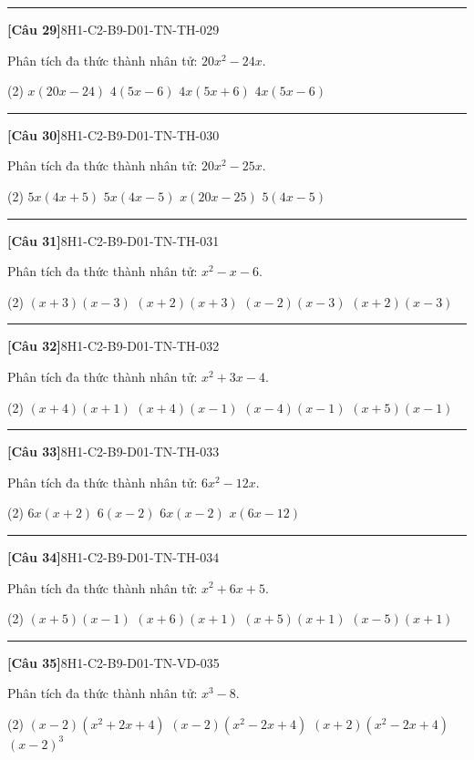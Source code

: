 \documentclass[12pt,a4paper]{article}
\newif\ifloigiai
\newenvironment{cauhoi}[2]{%
  \par\medskip\noindent\rule{\textwidth}{0.4pt}\par\nopagebreak
  \noindent\textbf{[#1]}\hfill{\scriptsize\ttfamily #2}\par\nopagebreak\smallskip}{\par}
\newcommand{\dapan}[1]{\ifloigiai\par\smallskip\noindent\textit{Đáp án:} \textbf{#1}\par\fi}
\begin{document}
\begin{cauhoi}{Câu 29}{8H1-C2-B9-D01-TN-TH-029}
Phân tích đa thức thành nhân tử: $20x^{2} - 24x$.
\begin{tasks}(2)
\task $x(20x - 24)$
\task $4(5x - 6)$
\task $4x(5x + 6)$
\task $4x(5x - 6)$
\end{tasks}
\dapan{D}
\end{cauhoi}
\begin{cauhoi}{Câu 30}{8H1-C2-B9-D01-TN-TH-030}
Phân tích đa thức thành nhân tử: $20x^{2} - 25x$.
\begin{tasks}(2)
\task $5x(4x + 5)$
\task $5x(4x - 5)$
\task $x(20x - 25)$
\task $5(4x - 5)$
\end{tasks}
\dapan{B}
\end{cauhoi}
\begin{cauhoi}{Câu 31}{8H1-C2-B9-D01-TN-TH-031}
Phân tích đa thức thành nhân tử: $x^{2} - x - 6$.
\begin{tasks}(2)
\task $(x + 3)(x - 3)$
\task $(x + 2)(x + 3)$
\task $(x - 2)(x - 3)$
\task $(x + 2)(x - 3)$
\end{tasks}
\dapan{D}
\end{cauhoi}
\begin{cauhoi}{Câu 32}{8H1-C2-B9-D01-TN-TH-032}
Phân tích đa thức thành nhân tử: $x^{2} + 3x - 4$.
\begin{tasks}(2)
\task $(x + 4)(x + 1)$
\task $(x + 4)(x - 1)$
\task $(x - 4)(x - 1)$
\task $(x + 5)(x - 1)$
\end{tasks}
\dapan{B}
\end{cauhoi}
\begin{cauhoi}{Câu 33}{8H1-C2-B9-D01-TN-TH-033}
Phân tích đa thức thành nhân tử: $6x^{2} - 12x$.
\begin{tasks}(2)
\task $6x(x + 2)$
\task $6(x - 2)$
\task $6x(x - 2)$
\task $x(6x - 12)$
\end{tasks}
\dapan{C}
\end{cauhoi}
\begin{cauhoi}{Câu 34}{8H1-C2-B9-D01-TN-TH-034}
Phân tích đa thức thành nhân tử: $x^{2} + 6x + 5$.
\begin{tasks}(2)
\task $(x + 5)(x - 1)$
\task $(x + 6)(x + 1)$
\task $(x + 5)(x + 1)$
\task $(x - 5)(x + 1)$
\end{tasks}
\dapan{C}
\end{cauhoi}
\begin{cauhoi}{Câu 35}{8H1-C2-B9-D01-TN-VD-035}
Phân tích đa thức thành nhân tử: $x^{3}-8$.
\begin{tasks}(2)
\task $(x-2)(x^{2}+2x+4)$
\task $(x-2)(x^{2}-2x+4)$
\task $(x+2)(x^{2}-2x+4)$
\task $(x-2)^{3}$
\end{tasks}
\dapan{A}
\end{cauhoi}
\end{document}
